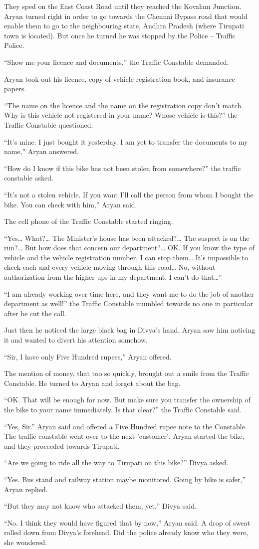 They sped on the East Coast Road until they reached the Kovalam Junction. Aryan
turned right in order to go towards the Chennai Bypass road that would enable
them to go to the neighbouring state, Andhra Pradesh (where Tirupati town is
located). But once he turned he was stopped by the Police – Traffic Police.

“Show me your licence and documents,” the Traffic Constable demanded.

Aryan took out his licence, copy of vehicle registration book, and insurance
papers.

“The name on the licence and the name on the registration copy don't match. Why
is this vehicle not registered in your name? Whose vehicle is this?” the Traffic
Constable questioned.

“It's mine. I just bought it yesterday. I am yet to transfer the documents to my
name,” Aryan answered.

“How do I know if this bike has not been stolen from somewhere?” the traffic
constable asked.

“It's not a stolen vehicle. If you want I'll call the person from whom I bought
the bike. You can check with him,” Aryan said.

The cell phone of the Traffic Constable started ringing.

“Yes… What?… The Minister's house has been attacked?… The suspect is on
the run?… But how does that concern our department?… OK. If you know the
type of vehicle and the vehicle registration number, I can stop them… It's
impossible to check each and every vehicle moving through this road… No,
without authorization from the higher-ups in my department, I can't do that…”

“I am already working over-time here, and they want me to do the job of another
department as well!” the Traffic Constable mumbled towards no one in particular
after he cut the call.

Just then he noticed the large black bag in Divya's hand. Aryan saw him noticing
it and wanted to divert his attention somehow.

“Sir, I have only Five Hundred rupees,” Aryan offered.

The mention of money, that too so quickly, brought out a smile from the Traffic
Constable. He turned to Aryan and forgot about the bag.

“OK. That will be enough for now. But make sure you transfer the ownership of
the bike to your name immediately. Is that clear?” the Traffic Constable said.

“Yes, Sir.” Aryan said and offered a Five Hundred rupee note to the Constable.
The traffic constable went over to the next 'customer', Aryan started the bike,
and they proceeded towards Tirupati.

“Are we going to ride all the way to Tirupati on this bike?” Divya asked.

“Yes. Bus stand and railway station maybe monitored. Going by bike is safer,”
Aryan replied.

“But they may not know who attacked them, yet,” Divya said.

“No. I think they would have figured that by now,” Aryan said. A drop of sweat
rolled down from Divya's forehead. Did the police already know who they were,
she wondered.